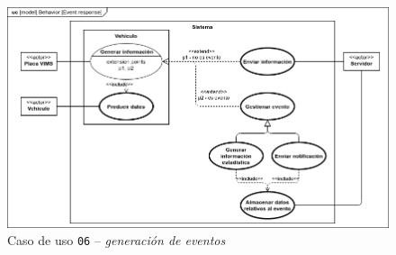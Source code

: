 \begin{figure}[H]
  \centering
  \includegraphics[width=\linewidth]{diagrams/UseCases-UC6 - reaction.png}
  \caption{Caso de uso \texttt{06} -- \textit{generación de eventos}}
  \label{uc:reaction}
\end{figure}

